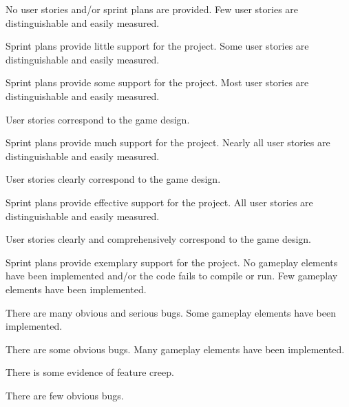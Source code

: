 \documentclass{../fal_assignment}
\begin{document}
\begin{markingrubric}
%
        \grade\fail No user stories and/or sprint plans are provided.
        \grade Few user stories are distinguishable and easily measured.
            \par Sprint plans provide little support for the project.
        \grade Some user stories are distinguishable and easily measured.
            \par Sprint plans provide some support for the project.
        \grade Most user stories are distinguishable and easily measured.
            \par User stories correspond to the game design.
            \par Sprint plans provide much support for the project.
        \grade Nearly all user stories are distinguishable and easily measured.
            \par User stories clearly correspond to the game design.
            \par Sprint plans provide effective support for the project.
        \grade All user stories are distinguishable and easily measured.
            \par User stories clearly and comprehensively correspond to the game design.
            \par Sprint plans provide exemplary support for the project.
%
        \grade\fail No gameplay elements have been implemented and/or the code fails to compile or run.
        \grade Few gameplay elements have been implemented.
            \par There are many obvious and serious bugs.
        \grade Some gameplay elements have been implemented.
            \par There are some obvious bugs.
        \grade Many gameplay elements have been implemented.
            \par There is some evidence of feature creep.
            \par There are few obvious bugs.

\end{markingrubric}
\end{document}
